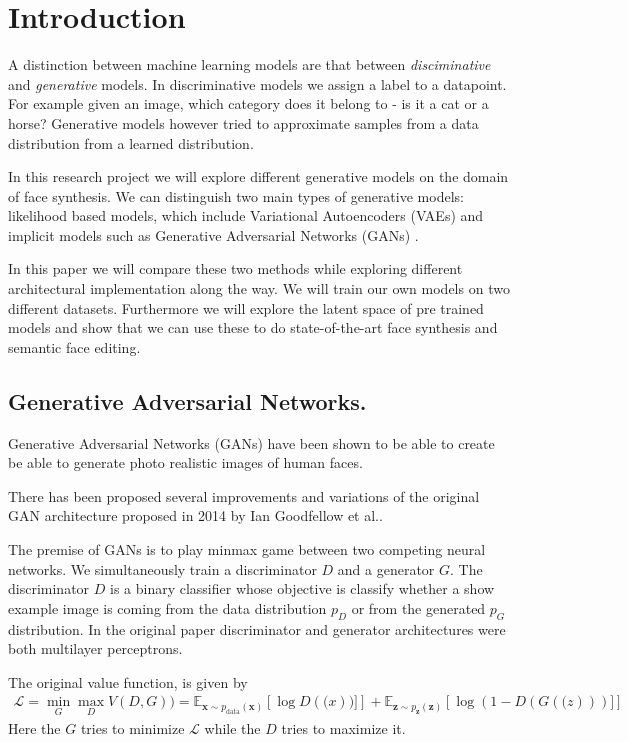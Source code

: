 \chapter{Introduction}


A distinction between machine learning models are that between \emph{disciminative} and \emph{generative} models. In discriminative models we assign a label to a datapoint. For example given an image, which category does it belong to - is it a cat or a horse? Generative models however tried to approximate samples from a data distribution from a learned distribution.

In this research project we will explore different generative models on the domain of face synthesis. We can distinguish two main types of generative models: likelihood based models, which include Variational Autoencoders (VAEs) and implicit models such as Generative Adversarial Networks (GANs) \cite{vqvae2}.

In this paper we will compare these two methods while exploring different architectural implementation along the way. We will train our own models on two different datasets. Furthermore we will explore the latent space of pre trained models and show that we can use these to do state-of-the-art face synthesis and semantic face editing.

\section{Generative Adversarial Networks.}

Generative Adversarial Networks (GANs) have been shown to be able to create be able to generate photo realistic images of human faces.\cite{progan}

There has been proposed several improvements and variations of the original GAN architecture proposed in 2014 by Ian Goodfellow et al.\cite{gan}.

The premise of GANs is to play minmax game between two competing neural networks. We simultaneously train a discriminator $D$ and a generator $G$.
The discriminator $D$ is a binary classifier whose objective is classify whether a show example image is coming from the data distribution $p_D$ or from the generated $p_G$ distribution. In the original paper discriminator and generator architectures were both multilayer perceptrons.

The original value function, is given by
\begin{align}
\mathcal{L} = \min_G \max_D V(D,G))=\mathbb{E}_{\mathbf{x}\sim p_{\text{data}}(\mathbf{x})}
\left[\log D(\mathbf(x))]\right]+
\mathbb{E}_{\mathbf{z}\sim p_{\mathbf{z}}(\mathbf{z})}
\left[\log (1-D(G(\mathbf(z)))]\right]
\end{align}
Here the $G$ tries to minimize $\mathcal{L}$ while the $D$ tries to maximize it.

